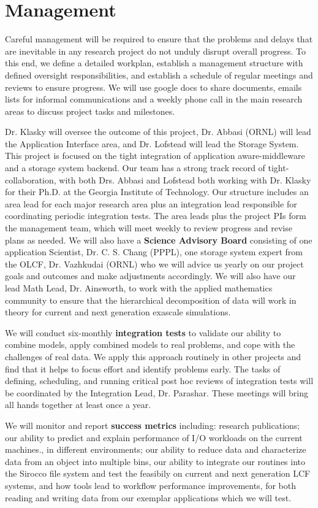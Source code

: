 \section{Management}
\label{sec:management}

Careful management will be required to ensure that the problems and delays that are inevitable in any research project
do not unduly disrupt overall progress. To this end, we define a detailed workplan,
establish a  management structure with defined oversight responsibilities, and establish a schedule of regular meetings and
reviews to ensure progress.  We will use google docs to share documents, emails lists for informal communications and a 
weekly phone call in the main research areas to discuss project tasks and milestones. 

Dr. Klasky will oversee the outcome of this project,  Dr. Abbasi (ORNL) will lead the Application Interface area, and Dr. Lofstead
will lead the Storage System. This project is focused on the tight integration of application aware-middleware and a storage system backend.
Our team has a strong track record of tight-collaboration, with both Drs. Abbasi and Lofstead both working with Dr. Klasky for their Ph.D. at the Georgia
Institute of Technology.  Our structure includes an area lead for each major research area plus
an integration lead responsible for coordinating periodic integration tests. The area leads plus the project PIs
form the management team, which will meet weekly to review progress and revise plans as needed.
We will also have a {\bf Science Advisory Board} consisting of one application Scientist, Dr. C. S. Chang (PPPL), one storage system expert from the 
OLCF, Dr. Vazhkudai (ORNL) who we will advice us yearly on our project goals and outcomes and make adjustments accordingly. We will also have our
lead Math Lead, Dr. Ainsworth, to work with the applied mathematics community to ensure that the hierarchical decomposition of data will work in theory
for current and next generation exascale simulations. 

We will conduct six-monthly {\bf integration tests}  to validate our ability to combine models, apply
combined models to real problems, and cope with the challenges of real data. We apply this approach routinely
in other projects and find that it helps to focus effort and identify problems early. The tasks of defining,
scheduling, and running critical post hoc reviews of integration tests will be coordinated by the Integration Lead, Dr. Parashar. 
These meetings will bring all hands together at least once a year.

We will monitor and report {\bf success metrics} including: 
research publications;
our ability to predict and explain performance of I/O workloads on the current machines., in different environments;
our ability to reduce data and characterize data from an object into multiple bins, 
our ability to integrate our routines into the Sirocco file system and test the feasibily on current and next generation LCF systems, and
how tools lead to workflow performance improvements, for both reading and writing data from our exemplar applications which we will test.
